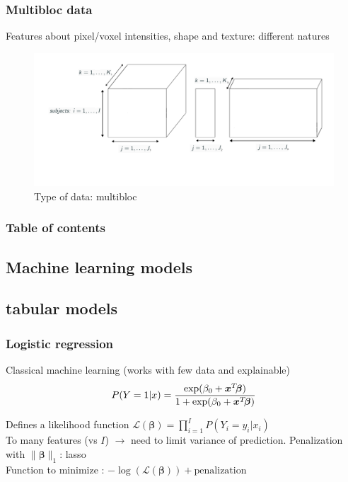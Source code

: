 \documentclass{beamer}
\begin{document}
\begin{frame}
    \frametitle{Multibloc data}
    Features about pixel/voxel intensities, shape and texture: different natures
    \begin{figure}
        \centering
        \includegraphics[scale = 0.25]{images/blocks.png}
        \caption{Type of data: multibloc}
    \end{figure}
\end{frame}



\begin{frame}
    \frametitle{Table of contents}
    \tableofcontents
\end{frame}

\begin{frame}
    \section{Machine learning models}
    \subsection{tabular models}
\end{frame}

\begin{frame}
    \frametitle{Logistic regression}
    Classical machine learning (works with few data and explainable)\\[10 pt]

    $$P(Y = 1|x) = \frac{\exp(\beta_0 + \bm{x}^T\hspace{-2 pt}\bm{\beta})}{1 + \exp(\beta_0 + \bm{x}^T\hspace{-2 pt}\bm{\beta})}$$

    Defines a likelihood function $\mathcal{L}(\bm{\beta}) = \prod_{i = 1}^I P(Y_i = y_i|x_i)$\\[15 pt]

    To many features (vs $I$) $\rightarrow$ need to limit variance of prediction. Penalization with $\lVert \bm{\beta} \rVert_1$: lasso\\[15 pt]

    Function to minimize : $- \log(\mathcal{L}(\bm{\beta})) + \text{penalization}$ 
\end{frame}
\end{document}
